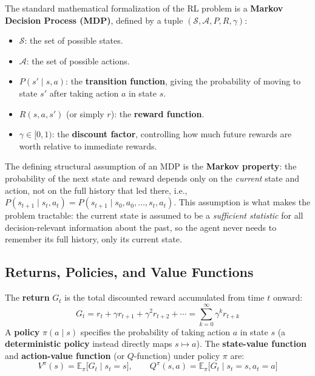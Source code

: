 \documentclass[12pt,a4paper]{article}
\begin{document}
\begin{defbox}
The standard mathematical formalization of the RL problem is a \textbf{Markov Decision Process (MDP)}, defined by a tuple $(\mathcal{S}, \mathcal{A}, P, R, \gamma)$:
\begin{itemize}[leftmargin=1.5em]
    \item $\mathcal{S}$: the set of possible states.
    \item $\mathcal{A}$: the set of possible actions.
    \item $P(s' \mid s, a)$: the \textbf{transition function}, giving the probability of moving to state $s'$ after taking action $a$ in state $s$.
    \item $R(s,a,s')$ (or simply $r$): the \textbf{reward function}.
    \item $\gamma \in [0,1)$: the \textbf{discount factor}, controlling how much future rewards are worth relative to immediate rewards.
\end{itemize}
\end{defbox}

\begin{keyidea}
The defining structural assumption of an MDP is the \textbf{Markov property}: the probability of the next state and reward depends only on the \emph{current} state and action, not on the full history that led there, i.e., $P(s_{t+1}\mid s_t, a_t) = P(s_{t+1}\mid s_0,a_0,\ldots,s_t,a_t)$. This assumption is what makes the problem tractable: the current state is assumed to be a \emph{sufficient statistic} for all decision-relevant information about the past, so the agent never needs to remember its full history, only its current state.
\end{keyidea}

\subsection{Returns, Policies, and Value Functions}

\begin{defbox}
The \textbf{return} $G_t$ is the total discounted reward accumulated from time $t$ onward:
\[
G_t = r_t + \gamma r_{t+1} + \gamma^2 r_{t+2} + \cdots = \sum_{k=0}^{\infty} \gamma^k r_{t+k}
\]
A \textbf{policy} $\pi(a\mid s)$ specifies the probability of taking action $a$ in state $s$ (a \textbf{deterministic policy} instead directly maps $s \mapsto a$). The \textbf{state-value function} and \textbf{action-value function} (or $Q$-function) under policy $\pi$ are:
\[
V^\pi(s) = \mathbb{E}_\pi\big[G_t \mid s_t = s\big], \qquad
Q^\pi(s,a) = \mathbb{E}_\pi\big[G_t \mid s_t = s, a_t = a\big]
\]
\end{defbox}
\end{document}
